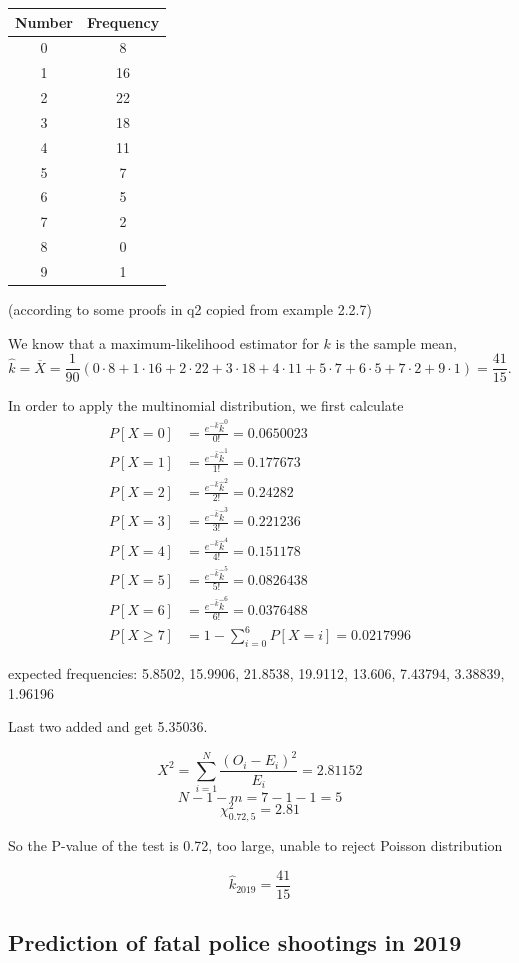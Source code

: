 \documentclass[conf]{new-aiaa}
\begin{document}
\begin{tabular}{cc}
Number & Frequency \\\hline
0 & 8 \\
1 & 16 \\
2 & 22 \\
3 & 18 \\
4 & 11 \\
5 & 7 \\
6 & 5 \\
7 & 2 \\
8 & 0 \\
9 & 1 
\end{tabular}

(according to some proofs in q2 copied from example 2.2.7)

We know that a maximum-likelihood estimator for $k$ is the sample mean,
$$\hat{k}=\overline{X}=\frac{1}{90}
(0\cdot8+1\cdot16+2\cdot22+3\cdot18+4\cdot11
+5\cdot7+6\cdot5+7\cdot2+9\cdot1)=\frac{41}{15}.$$

In order to apply the multinomial distribution, we first calculate
\begin{align*}
P[X=0]&=\frac{e^{-\hat{k}}\hat{k}^0}{0!}=0.0650023\\
P[X=1]&=\frac{e^{-\hat{k}}\hat{k}^1}{1!}=0.177673\\
P[X=2]&=\frac{e^{-\hat{k}}\hat{k}^2}{2!}=0.24282\\
P[X=3]&=\frac{e^{-\hat{k}}\hat{k}^3}{3!}=0.221236\\
P[X=4]&=\frac{e^{-\hat{k}}\hat{k}^4}{4!}=0.151178\\
P[X=5]&=\frac{e^{-\hat{k}}\hat{k}^5}{5!}=0.0826438\\
P[X=6]&=\frac{e^{-\hat{k}}\hat{k}^6}{6!}=0.0376488\\
P[X\geqslant7]&=1-\sum_{i=0}^6P[X=i]=0.0217996
\end{align*}

expected frequencies:
5.8502, 15.9906, 21.8538, 19.9112, 13.606, 7.43794, 3.38839, 1.96196

Last two added and get 5.35036.

$$X^2=\sum_{i=1}^N\frac{(O_i-E_i)^2}{E_i}=2.81152$$
$$N-1-m=7-1-1=5$$
$$\chi^2_{0.72,5}=2.81$$

So the P-value of the test is 0.72, too large, unable to reject Poisson distribution

$$\hat{k}_{2019}=\frac{41}{15}$$

\subsection{Prediction of fatal police shootings in 2019}
\end{document}
